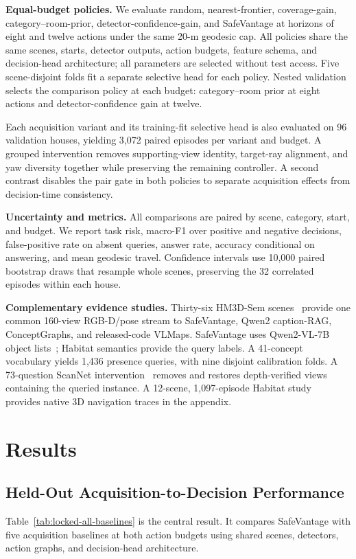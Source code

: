 \documentclass{article}
\newcommand{\method}{SafeVantage}
\begin{document}
\textbf{Equal-budget policies.}
We evaluate random, nearest-frontier, coverage-gain, category--room-prior, detector-confidence-gain, and \method{} at horizons of eight and twelve actions under the same 20-m geodesic cap. All policies share the same scenes, starts, detector outputs, action budgets, feature schema, and decision-head architecture; all parameters are selected without test access. Five scene-disjoint folds fit a separate selective head for each policy. Nested validation selects the comparison policy at each budget: category--room prior at eight actions and detector-confidence gain at twelve.

Each acquisition variant and its training-fit selective head is also evaluated on 96 validation houses, yielding 3,072 paired episodes per variant and budget. A grouped intervention removes supporting-view identity, target-ray alignment, and yaw diversity together while preserving the remaining controller. A second contrast disables the pair gate in both policies to separate acquisition effects from decision-time consistency.

\textbf{Uncertainty and metrics.}
All comparisons are paired by scene, category, start, and budget. We report task risk, macro-F1 over positive and negative decisions, false-positive rate on absent queries, answer rate, accuracy conditional on answering, and mean geodesic travel. Confidence intervals use 10,000 paired bootstrap draws that resample whole scenes, preserving the 32 correlated episodes within each house.

\textbf{Complementary evidence studies.}
Thirty-six HM3D-Sem scenes~\citep{yadav2023hm3dsem} provide one common 160-view RGB-D/pose stream to \method{}, Qwen2 caption-RAG, ConceptGraphs, and released-code VLMaps. \method{} uses Qwen2-VL-7B object lists~\citep{wang2024qwen2vl}; Habitat semantics provide the query labels. A 41-concept vocabulary yields 1,436 presence queries, with nine disjoint calibration folds. A 73-question ScanNet intervention~\citep{dai2017scannet} removes and restores depth-verified views containing the queried instance. A 12-scene, 1,097-episode Habitat study~\citep{savva2019habitat} provides native 3D navigation traces in the appendix.

\section{Results}
\subsection{Held-Out Acquisition-to-Decision Performance}
Table~\ref{tab:locked-all-baselines} is the central result. It compares \method{} with five acquisition baselines at both action budgets using shared scenes, detectors, action graphs, and decision-head architecture.
\end{document}

